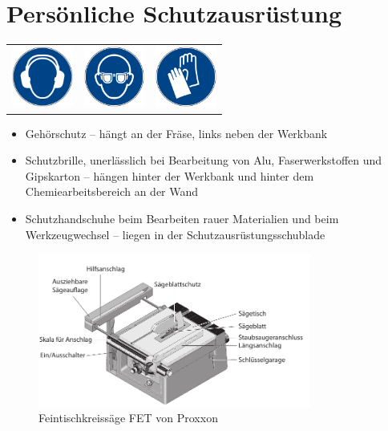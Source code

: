 \documentclass{\basedir/fablab-document}
\begin{document}
\section{Persönliche Schutzausrüstung}
\begin{table}[h]
	\centering
\begin{tabular}{ccc}

\includegraphics[width=2cm]{bilder/ggehoerschutz.png} & \includegraphics[width=2cm]{bilder/gaugenschutz.png}  & \includegraphics[width=2cm]{bilder/ghandschuh.png} \\
 \end{tabular}
\end{table}

\begin{itemize}
\item Gehörschutz -- hängt an der Fräse, links neben der Werkbank \\
\item Schutzbrille, unerlässlich bei Bearbeitung von Alu, Faserwerkstoffen und Gipskarton -- hängen hinter der Werkbank und hinter dem Chemiearbeitsbereich an der Wand \\
\item Schutzhandschuhe beim Bearbeiten rauer Materialien und beim Werkzeugwechsel -- liegen in der Schutzausrüstungsschublade \\
\end{itemize}

\begin{figure}[h!]
    \centering
    \includegraphics[width=0.8\textwidth]{bilder/saege-sketch.pdf}
    \caption{Feintischkreissäge FET von Proxxon}
    \label{fig:sketch}
\end{figure}
\end{document}
